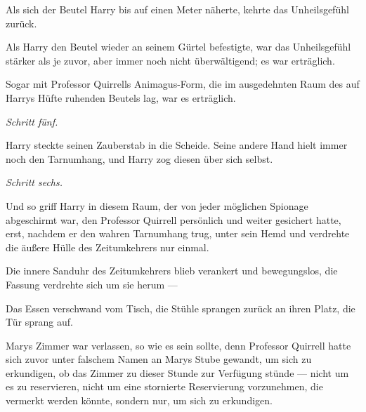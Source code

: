 Als sich der Beutel Harry bis auf einen Meter näherte, kehrte das Unheilsgefühl zurück.

Als Harry den Beutel wieder an seinem Gürtel befestigte, war das Unheilsgefühl stärker als je zuvor, aber immer noch nicht überwältigend; es war erträglich.

Sogar mit Professor Quirrells Animagus-Form, die im ausgedehnten Raum des auf Harrys Hüfte ruhenden Beutels lag, war es erträglich.

\emph{Schritt fünf.}

Harry steckte seinen Zauberstab in die Scheide. Seine andere Hand hielt immer noch den Tarnumhang, und Harry zog diesen über sich selbst.

\emph{Schritt sechs.}

Und so griff Harry in diesem Raum, der von jeder möglichen Spionage abgeschirmt war, den Professor Quirrell persönlich und weiter gesichert hatte, erst, nachdem er den wahren Tarnumhang trug, unter sein Hemd und verdrehte die äußere Hülle des Zeitumkehrers nur einmal.

Die innere Sanduhr des Zeitumkehrers blieb verankert und bewegungslos, die Fassung verdrehte sich um sie herum —

Das Essen verschwand vom Tisch, die Stühle sprangen zurück an ihren Platz, die Tür sprang auf.

Marys Zimmer war verlassen, so wie es sein sollte, denn Professor Quirrell hatte sich zuvor unter falschem Namen an Marys Stube gewandt, um sich zu erkundigen, ob das Zimmer zu dieser Stunde zur Verfügung stünde — nicht um es zu reservieren, nicht um eine stornierte Reservierung vorzunehmen, die vermerkt werden könnte, sondern nur, um sich zu erkundigen.


